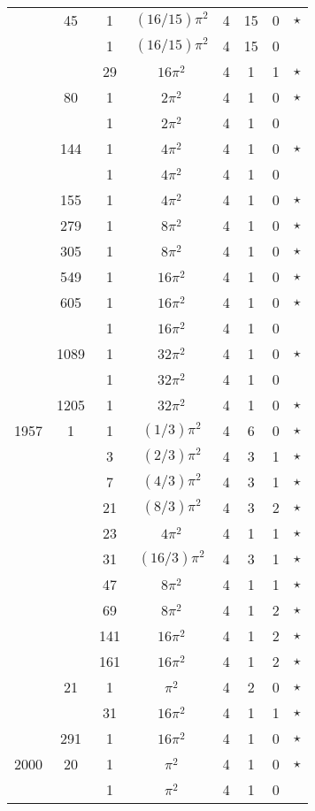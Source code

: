 \documentclass[12pt]{amsart}
\begin{document}
\begin{tabular}{ccc|ccccc}
 & 45 & 1 & $(16/15)\pi^2$ & 4 & 15 & 0 & $\star$ \\
 &  & 1 & $(16/15)\pi^2$ & 4 & 15 & 0 &  \\
 &  & 29 & $16\pi^2$ & 4 & 1 & 1 & $\star$ \\
 & 80 & 1 & $2\pi^2$ & 4 & 1 & 0 & $\star$ \\
 &  & 1 & $2\pi^2$ & 4 & 1 & 0 &  \\
 & 144 & 1 & $4\pi^2$ & 4 & 1 & 0 & $\star$ \\
 &  & 1 & $4\pi^2$ & 4 & 1 & 0 &  \\
 & 155 & 1 & $4\pi^2$ & 4 & 1 & 0 & $\star$ \\
 & 279 & 1 & $8\pi^2$ & 4 & 1 & 0 & $\star$ \\
 & 305 & 1 & $8\pi^2$ & 4 & 1 & 0 & $\star$ \\
 & 549 & 1 & $16\pi^2$ & 4 & 1 & 0 & $\star$ \\
 & 605 & 1 & $16\pi^2$ & 4 & 1 & 0 & $\star$ \\
 &  & 1 & $16\pi^2$ & 4 & 1 & 0 &  \\
 & 1089 & 1 & $32\pi^2$ & 4 & 1 & 0 & $\star$ \\
 &  & 1 & $32\pi^2$ & 4 & 1 & 0 &  \\
 & 1205 & 1 & $32\pi^2$ & 4 & 1 & 0 & $\star$ \\
1957 & 1 & 1 & $(1/3)\pi^2$ & 4 & 6 & 0 & $\star$ \\
 &  & 3 & $(2/3)\pi^2$ & 4 & 3 & 1 & $\star$ \\
 &  & 7 & $(4/3)\pi^2$ & 4 & 3 & 1 & $\star$ \\
 &  & 21 & $(8/3)\pi^2$ & 4 & 3 & 2 & $\star$ \\
 &  & 23 & $4\pi^2$ & 4 & 1 & 1 & $\star$ \\
 &  & 31 & $(16/3)\pi^2$ & 4 & 3 & 1 & $\star$ \\
 &  & 47 & $8\pi^2$ & 4 & 1 & 1 & $\star$ \\
 &  & 69 & $8\pi^2$ & 4 & 1 & 2 & $\star$ \\
 &  & 141 & $16\pi^2$ & 4 & 1 & 2 & $\star$ \\
 &  & 161 & $16\pi^2$ & 4 & 1 & 2 & $\star$ \\
 & 21 & 1 & $\pi^2$ & 4 & 2 & 0 & $\star$ \\
 &  & 31 & $16\pi^2$ & 4 & 1 & 1 & $\star$ \\
 & 291 & 1 & $16\pi^2$ & 4 & 1 & 0 & $\star$ \\
2000 & 20 & 1 & $\pi^2$ & 4 & 1 & 0 & $\star$ \\
 &  & 1 & $\pi^2$ & 4 & 1 & 0 &  \\

\end{tabular}
\end{document}
